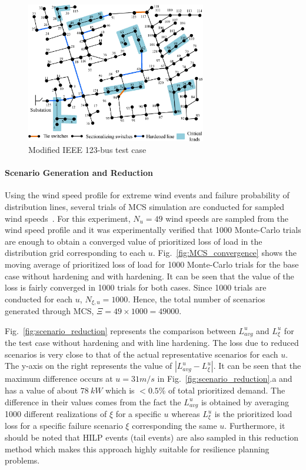 \begin{figure}[t]
    \centering
    \includegraphics[width=0.7\textwidth]{figures/IEEE_123_CL_update.eps}
    \caption{Modified IEEE 123-bus test case}
    \label{fig:IEEE_123_CL_update}
\end{figure}

\paragraph{Scenario Generation and Reduction}
Using the wind speed profile for extreme wind events and failure probability of distribution lines, several trials of MCS simulation are conducted for sampled wind speeds~\cite{7036086}. For this experiment, $N_u=49$ wind speeds are sampled from the wind speed profile and it was experimentally verified that 1000 Monte-Carlo trials are enough to obtain a converged value of prioritized loss of load in the distribution grid corresponding to each $u$. Fig.~\ref{fig:MCS_convergence} shows the moving average of prioritized loss of load for 1000 Monte-Carlo trials for the base case without hardening and with hardening. It can be seen that the value of the loss is fairly converged in 1000 trials for both cases. Since 1000 trials are conducted for each $u$, $N_{\xi,u} = 1000$. Hence, the total number of scenarios generated through MCS, $\Xi = 49 \times 1000 = 49000$. 

Fig.~\ref{fig:scenario_reduction} represents the comparison between $L^u_{avg}$ and $L^u_\xi$ for the test case without hardening and with line hardening. The loss due to reduced scenarios is very close to that of the actual representative scenarios for each $u$. The y-axis on the right represents the value of $|L^u_{avg} - L^u_\xi|$. It can be seen that the maximum difference occurs at $u = 31 m/s$ in Fig.~\ref{fig:scenario_reduction}.a and has a value of about $78~kW$ which is $< 0.5\%$ of total prioritized demand. The difference in their values comes from the fact the $L^u_{avg}$ is obtained by averaging 1000 different realizations of $\xi$ for a specific $u$ whereas $L^u_\xi$ is the prioritized load loss for a specific failure scenario $\xi$ corresponding the same $u$. Furthermore, it should be noted that HILP events (tail events) are also sampled in this reduction method which makes this approach highly suitable for resilience planning problems.

